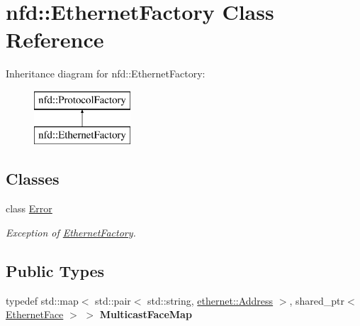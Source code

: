 \hypertarget{classnfd_1_1EthernetFactory}{}\section{nfd\+:\+:Ethernet\+Factory Class Reference}
\label{classnfd_1_1EthernetFactory}
Inheritance diagram for nfd\+:\+:Ethernet\+Factory\+:\begin{figure}[H]
\begin{center}
\leavevmode
\includegraphics[height=2.000000cm]{classnfd_1_1EthernetFactory}
\end{center}
\end{figure}
\subsection*{Classes}
\begin{DoxyCompactItemize}
\item 
class \hyperlink{classnfd_1_1EthernetFactory_1_1Error}{Error}
\begin{DoxyCompactList}\small\item\em Exception of \hyperlink{classnfd_1_1EthernetFactory}{Ethernet\+Factory}. \end{DoxyCompactList}\end{DoxyCompactItemize}
\subsection*{Public Types}
\begin{DoxyCompactItemize}
\item 
typedef std\+::map$<$ std\+::pair$<$ std\+::string, \hyperlink{classndn_1_1util_1_1ethernet_1_1Address}{ethernet\+::\+Address} $>$, shared\+\_\+ptr$<$ \hyperlink{classnfd_1_1EthernetFace}{Ethernet\+Face} $>$ $>$ {\bfseries Multicast\+Face\+Map}\hypertarget{classnfd_1_1EthernetFactory_a0dfac126ee3edffdf6eda8a1a08267a3}{}\label{classnfd_1_1EthernetFactory_a0dfac126ee3edffdf6eda8a1a08267a3}

\end{DoxyCompactItemize}
